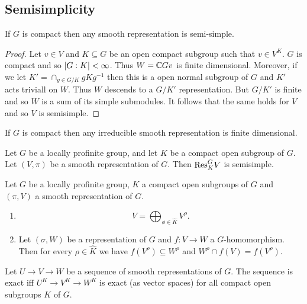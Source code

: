 \documentclass{memoir}
\begin{document}
\subsection{Semisimplicity}
\begin{proposition}
    If $G$ is compact then any smooth representation is semi-simple.
\end{proposition}
\begin{proof}
    Let $v\in V$ and $K\subseteq G$ be an open compact subgroup such that $v\in V^K$.
    $G$ is compact and so $\lvert G:K\rvert<\infty$.
    Thus $W = \mathbb{C} Gv$ is finite dimensional.
    Moreover, if we let $K' = \cap_{g\in G/K}gKg^{-1}$ then this is a open normal subgroup of $G$ and $K'$ acts triviall on $W$.
    Thus $W$ descends to a $G/K'$ representation.
    But $G/K'$ is finite and so $W$ is a sum of its simple submodules.
    It follows that the same holds for $V$ and so $V$ is semisimple.
\end{proof}
\begin{corollary}
    If $G$ is compact then any irreducible smooth representation is finite dimensional.
\end{corollary}
\begin{corollary}
    Let $G$ be a locally profinite group, and let $K$ be a compact open subgroup of $G$. 
    Let $(V,\pi)$ be a smooth representation of $G$.
    Then $\text{Res}_K^GV$ is semisimple.
\end{corollary}
\begin{proposition}
    Let $G$ be a locally profinite group, $K$ a compact open subgroups of $G$ and $(\pi,V)$ a smooth representation of $G$.
    \begin{enumerate}
        \item
            \begin{equation}
                V = \bigoplus_{\phi \in \hat K}V^\rho.
            \end{equation}
        \item Let $(\sigma,W)$ be a representation of $G$ and $f:V\to W$ a $G$-homomorphism.
            Then for every $\rho\in \hat K$ we have $f(V^\rho)\subseteq W^\rho$ and $W^\rho\cap f(V) = f(V^\rho)$.
    \end{enumerate}
\end{proposition}
\begin{corollary}
    Let $U\to V\to W$ be a sequence of smooth representations of $G$.
    The sequence is exact iff $U^K\to V^K\to W^K$ is exact (as vector spaces) for all compact open subgroups $K$ of $G$.
\end{corollary}
\end{document}
